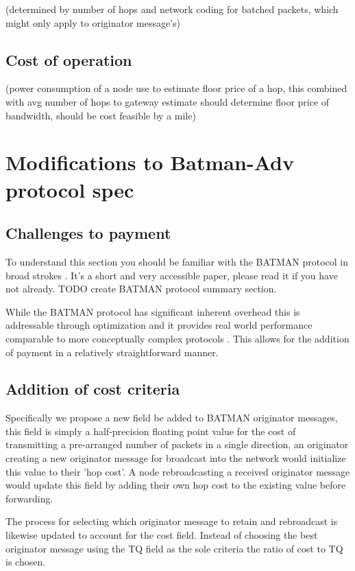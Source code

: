 \documentclass[11pt]{article}
\begin{document}
    (determined by number of hops and network coding for batched packets, which might only apply to originator message's)

    \subsection{Cost of operation}

    (power consumption of a node use to estimate floor price of a hop, this combined with avg number of hops to gateway estimate should determine floor price of bandwidth, should be cost feasible by a mile)

\section{Modifications to Batman-Adv protocol spec}

	\subsection{Challenges to payment}

	To understand this section you should be familiar with the BATMAN protocol in broad strokes \cite{batman}. It's a short and very accessible paper, please read it if you have not already. TODO create BATMAN protocol summary section.

	While the BATMAN protocol has significant inherent overhead this is addressable through optimization \cite{catwoman, batroam} and it provides real world performance comparable to more conceptually complex protocols \cite{meshperf}. This allows for the addition of payment in a relatively straightforward manner.

	\subsection{Addition of cost criteria}

		Specifically we propose a new field be added to BATMAN originator messages, this field is simply a half-precision floating point value for the cost of transmitting a pre-arranged number of packets in a single direction, an originator creating a new originator message for broadcast into the network would initialize this value to their 'hop cost'. A node rebroadcasting a received originator message would update this field by adding their own hop cost to the existing value before forwarding.

	        The process for selecting which originator message to retain and rebroadcast is likewise updated to account for the cost field. Instead of choosing the best originator message using the TQ field as the sole criteria the ratio of cost to TQ is chosen.
\end{document}
